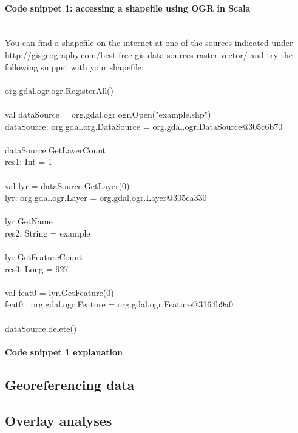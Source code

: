 \documentclass {article}
\begin{document}
\paragraph{ Code snippet 1: accessing a shapefile using OGR in Scala} 
\\
You can find a shapefile on the internet at one of the sources indicated under \href{http://gisgeography.com/best-free-gis-data-sources-raster-vector/}{http://gisgeography.com/best-free-gis-data-sources-raster-vector/} and try the following snippet with your shapefile: \\
\\
org.gdal.ogr.ogr.RegisterAll() \\
\\
val dataSource = org.gdal.ogr.ogr.Open("example.shp")\\  
dataSource: org.gdal.org.DataSource = org.gdal.ogr.DataSource@305c6b70 \\
\\
dataSource.GetLayerCount \\
res1: Int = 1 \\
\\
val lyr = dataSource.GetLayer(0) \\
lyr: org.gdal.ogr.Layer = org.gdal.ogr.Layer@305ca330 \\ 
\\
lyr.GetName \\
res2: String = example \\
\\
lyr.GetFeatureCount \\
res3: Long = 927 \\
\\
val feat0 = lyr.GetFeature(0) \\
feat0 : org.gdal.ogr.Feature = org.gdal.ogr.Feature@3164b9a0\\
\\
dataSource.delete() \\

\paragraph {Code snippet 1 explanation}

\subsection {Georeferencing data}      

\subsection {Overlay analyses}
\end{document}
